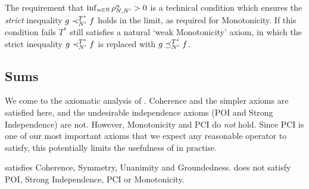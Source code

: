 The requirement that $\inf_{n \in \mathbb{N}}{\rho_{N,N'}^n} > 0$ is a technical
condition which ensures the \emph{strict} inequality $g \prec_{N'}^{T^*} f$
holds in the limit, as required for Monotonicity. If this condition fails $T^*$
still satisfies a natural `weak Monotonicity' axiom, in which the strict
inequality $g \prec_{N'}^{T^*} f$ is replaced with $g \preceq_{N'}^{T^*} f$.

\subsection{Sums}

We come to the axiomatic analysis of \sums{}. Coherence and the simpler axioms
are satisfied here, and the undesirable independence axioms (POI and Strong
Independence) are not. However, Monotonicity and PCI do \emph{not} hold. Since
PCI is one of our most important axioms that we expect any reasonable operator
to satisfy, this potentially limits the usefulness of \sums{} in practise.

\begin{theorem}
\label{td_thm_sums_axioms}
\sums{} satisfies Coherence, Symmetry, Unanimity and Groundedness. \sums{} does
not satisfy POI, Strong Independence, PCI or Monotonicity.
\end{theorem}

